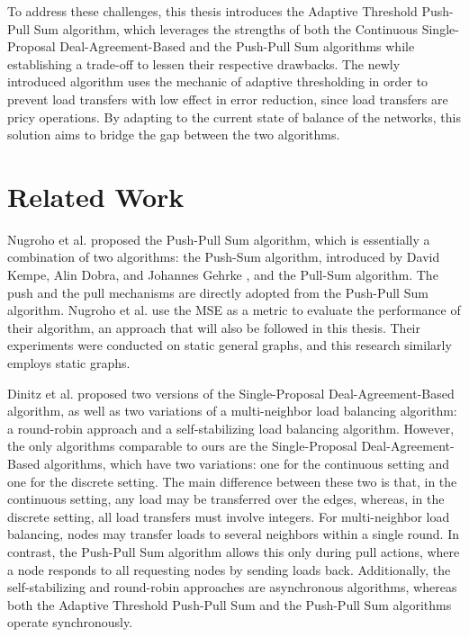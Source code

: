 To address these challenges, this thesis introduces the Adaptive Threshold Push-Pull Sum algorithm, which leverages the strengths of both the Continuous Single-Proposal Deal-Agreement-Based and the Push-Pull Sum algorithms while establishing a trade-off to lessen their respective drawbacks. The newly introduced algorithm uses the mechanic of adaptive thresholding in order to prevent load transfers with low effect in error reduction, since load transfers are pricy operations. By adapting to the current state of balance of the networks, this solution aims to bridge the gap between the two algorithms.

\section{Related Work}\label{sec:relatedwork}
Nugroho et al. \cite{nugroho2023PushPullSumDataAg} proposed the Push-Pull Sum algorithm, which is essentially a combination of two algorithms: the Push-Sum algorithm, introduced by David Kempe, Alin Dobra, and Johannes Gehrke \cite{kempe2003gossipbasedComp}, and the Pull-Sum algorithm. The push and the pull mechanisms are directly adopted from the Push-Pull Sum algorithm. Nugroho et al. use the MSE as a metric to evaluate the performance of their algorithm, an approach that will also be followed in this thesis. Their experiments were conducted on static general graphs, and this research similarly employs static graphs.

Dinitz et al. \cite{Dinitz2023DAB} proposed two versions of the Single-Proposal Deal-Agreement-Based algorithm, as well as two variations of a multi-neighbor load balancing algorithm: a round-robin approach and a self-stabilizing load balancing algorithm. However, the only algorithms comparable to ours are the Single-Proposal Deal-Agreement-Based algorithms, which have two variations: one for the continuous setting and one for the discrete setting. The main difference between these two is that, in the continuous setting, any load may be transferred over the edges, whereas, in the discrete setting, all load transfers must involve integers. For multi-neighbor load balancing, nodes may transfer loads to several neighbors within a single round. In contrast, the Push-Pull Sum algorithm allows this only during pull actions, where a node responds to all requesting nodes by sending loads back. Additionally, the self-stabilizing and round-robin approaches are asynchronous algorithms, whereas both the Adaptive Threshold Push-Pull Sum and the Push-Pull Sum algorithms operate synchronously.

